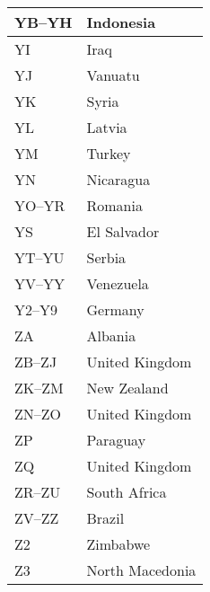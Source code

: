 \begin{longtable}{|l|l|}
  \hline
  YB--YH              & Indonesia                                 \\
  \hline
  YI                  & Iraq                                      \\
  \hline
  YJ                  & Vanuatu                                   \\
  \hline
  YK                  & Syria                                     \\
  \hline
  YL                  & Latvia                                    \\
  \hline
  YM                  & Turkey                                    \\
  \hline
  YN                  & Nicaragua                                 \\
  \hline
  YO--YR              & Romania                                   \\
  \hline
  YS                  & El Salvador                               \\
  \hline
  YT--YU              & Serbia                                    \\
  \hline
  YV--YY              & Venezuela                                 \\
  \hline
  Y2--Y9              & Germany                                   \\
  \hline
  ZA                  & Albania                                   \\
  \hline
  ZB--ZJ              & United Kingdom                            \\
  \hline
  ZK--ZM              & New Zealand                               \\
  \hline
  ZN--ZO              & United Kingdom                            \\
  \hline
  ZP                  & Paraguay                                  \\
  \hline
  ZQ                  & United Kingdom                            \\
  \hline
  ZR--ZU              & South Africa                              \\
  \hline
  ZV--ZZ              & Brazil                                    \\
  \hline
  Z2                  & Zimbabwe                                  \\
  \hline
  Z3                  & North Macedonia                           \\
  \hline

\end{longtable}
